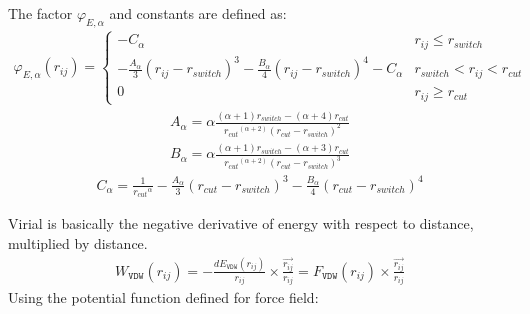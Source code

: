 \documentclass[letterpaper,10pt,english]{sphinxmanual}
\begin{document}
\begin{description}
\sphinxAtStartPar
The factor \(\varphi_{E, \alpha}\) and constants are defined as:
\begin{equation*}
\begin{split}\varphi_{E, \alpha}(r_{ij}) =
\begin{cases}
  -C_{\alpha} & r_{ij} \leq r_{switch} \\
  -\frac{A_{\alpha}}{3} (r_{ij} - r_{switch})^3 -\frac{B_{\alpha}}{4} (r_{ij} - r_{switch})^4 - C_{\alpha} & r_{switch} < r_{ij} < r_{cut} \\
  0 & r_{ij} \geq r_{cut}
\end{cases}\end{split}
\end{equation*}\begin{equation*}
\begin{split}A_{\alpha} = \alpha \frac{(\alpha + 1) r_{switch} - (\alpha +4) r_{cut}} {{r_{cut}}^{(\alpha + 2)} {(r_{cut} - r_{switch})}^2}\end{split}
\end{equation*}\begin{equation*}
\begin{split}B_{\alpha} = \alpha \frac{(\alpha + 1) r_{switch} - (\alpha +3) r_{cut}} {{r_{cut}}^{(\alpha + 2)} {(r_{cut} - r_{switch})}^3}\end{split}
\end{equation*}\begin{equation*}
\begin{split}C_{\alpha} =  \frac{1}{{r_{cut}}^{\alpha}} -\frac{A_{\alpha}}{3} (r_{cut} - r_{switch})^3 -\frac{B_{\alpha}}{4} (r_{cut} - r_{switch})^4\end{split}
\end{equation*}
\item[{\sphinxcode{\sphinxupquote{Virial Calculation}}}] \leavevmode
\sphinxAtStartPar
Virial is basically the negative derivative of energy with respect to distance, multiplied by distance.
\begin{equation*}
\begin{split}W_{\texttt{VDW}}(r_{ij}) = -\frac{dE_{\texttt{VDW}}(r_{ij})}{r_{ij}}\times \frac{\overrightarrow{r_{ij}}}{{r_{ij}}} = F_{\texttt{VDW}}(r_{ij}) \times \frac{\overrightarrow{r_{ij}}}{{r_{ij}}}\end{split}
\end{equation*}
\sphinxAtStartPar
Using the  potential function defined for  force field:
\begin{equation*}

\end{equation*}
\end{description}
\end{document}
